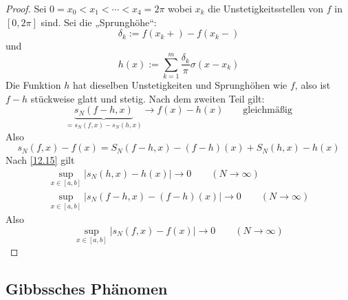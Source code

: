 \documentclass{mycourse}
\begin{document}
\begin{thm}
\begin{proof}
Sei $ 0=x_0<x_1<\dotsb < x_4=2\pi$ wobei $x_k$ die Unstetigkeitsstellen von $f$ in $[0,2\pi]$ sind.
Sei die „Sprunghöhe“:
\[
\delta_k:=f(x_k+)-f(x_k-)
\]
und
\[
h(x):=\sum_{k=1}^m\frac {\delta_k}\pi \sigma(x-x_k)
\]
Die Funktion $h$ hat dieselben Unstetigkeiten und Sprunghöhen wie $f$, also ist $f-h$ stückweise glatt und stetig.
Nach dem zweiten Teil gilt:
\[
\underbrace{s_N(f-h,x)}_{=s_N(f,x)-s_N(h,x)}\to f(x)-h(x) \qquad \text{gleichmäßig}
\]
Also
\[
s_N(f,x)-f(x) = S_N(f-h,x)-(f-h)(x) + S_N(h,x)-h(x)
\]
Nach \ref{12.15} gilt
\begin{align*}
\sup_{x\in[a,b]}|s_N(h,x)-h(x)|\to 0 \qquad (N\to \infty)\\
\sup_{x\in[a,b]}|s_N(f-h,x)-(f-h)(x)| \to 0 \qquad (N\to \infty)
\end{align*}
Also
\[
\sup_{x\in[a,b]}|s_N(f,x)-f(x)|\to 0\qquad (N\to \infty)
\]
\end{proof}
\end{thm}

\subsection{Gibbssches Phänomen}
\end{document}
